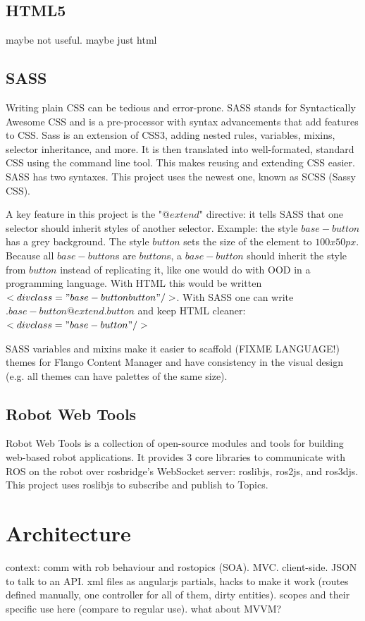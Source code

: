     
\subsection{HTML5}
maybe not useful. maybe just html

\subsection{SASS}
Writing plain \ac{CSS} can be tedious and error-prone.
SASS stands for Syntactically Awesome CSS and is a pre-processor with syntax advancements that add features to \ac{CSS}.
Sass is an extension of \ac{CSS}3, adding nested rules, variables, mixins, selector inheritance, and more.
It is then translated into well-formated, standard \ac{CSS} using the command line tool.
This makes reusing and extending \ac{CSS} easier.
SASS has two syntaxes. This project uses the newest one, known as \ac{SCSS} (Sassy CSS).

A key feature in this project is the "$@extend$" directive: it tells SASS that one selector should inherit styles of another selector.
Example: the style $base-button$ has a grey background. The style $button$ sets the size of the element to $100 x 50 px$.
Because all $base-button$s are $button$s, a $base-button$ should inherit the style from $button$ instead of replicating it, like one would do with \ac{OOD} in a programming language.
With \ac{HTML} this would be written $<div class="base-button button" />$.
With SASS one can write $.base-button { @extend .button }$ and keep \ac{HTML} cleaner: $<div class="base-button" />$

SASS variables and mixins make it easier to scaffold (FIXME LANGUAGE!) themes for Flango Content Manager and have consistency in the visual design (e.g. all themes can have palettes of the same size).

\subsection{Robot Web Tools}
Robot Web Tools is a collection of open-source modules and tools for building web-based robot applications.
It provides 3 core libraries to communicate with \ac{ROS} on the robot over rosbridge's WebSocket server: roslibjs, ros2js, and ros3djs.
This project uses roslibjs to subscribe and publish to Topics.

\section{Architecture}
context: comm with rob behaviour and rostopics (SOA).
MVC. client-side. JSON to talk to an API. xml files as angularjs partials, hacks to make it work (routes defined manually, one controller for all of them, dirty entities). scopes and their specific use here (compare to regular use). what about MVVM?

